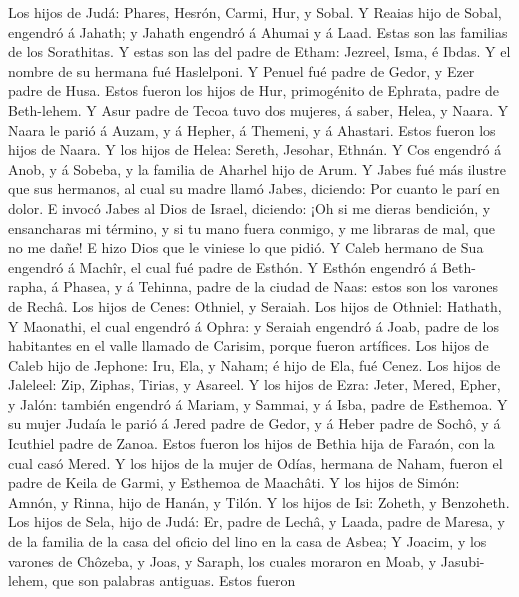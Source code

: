  Los hijos de Judá: Phares, Hesrón, Carmi, Hur, y Sobal.
 Y Reaias hijo de Sobal, engendró á Jahath; y Jahath
engendró á Ahumai y á Laad. Estas son las familias de los Sorathitas.
 Y estas son las del padre de Etham: Jezreel, Isma, é Ibdas.
Y el nombre de su hermana fué Haslelponi.  Y Penuel fué
padre de Gedor, y Ezer padre de Husa. Estos fueron los hijos de Hur,
primogénito de Ephrata, padre de Beth-lehem.  Y Asur padre
de Tecoa tuvo dos mujeres, á saber, Helea, y Naara.  Y Naara
le parió á Auzam, y á Hepher, á Themeni, y á Ahastari. Estos fueron los
hijos de Naara.  Y los hijos de Helea: Sereth, Jesohar,
Ethnán.  Y Cos engendró á Anob, y á Sobeba, y la familia de
Aharhel hijo de Arum.  Y Jabes fué más ilustre que sus
hermanos, al cual su madre llamó Jabes, diciendo: Por cuanto le parí en
dolor.  E invocó Jabes al Dios de Israel, diciendo: ¡Oh si
me dieras bendición, y ensancharas mi término, y si tu mano fuera
conmigo, y me libraras de mal, que no me dañe! E hizo Dios que le
viniese lo que pidió.  Y Caleb hermano de Sua engendró á
Machîr, el cual fué padre de Esthón.  Y Esthón engendró á
Beth-rapha, á Phasea, y á Tehinna, padre de la ciudad de Naas: estos son
los varones de Rechâ.  Los hijos de Cenes: Othniel, y
Seraiah. Los hijos de Othniel: Hathath,  Y Maonathi, el
cual engendró á Ophra: y Seraiah engendró á Joab, padre de los
habitantes en el valle llamado de Carisim, porque fueron artífices.
 Los hijos de Caleb hijo de Jephone: Iru, Ela, y Naham; é
hijo de Ela, fué Cenez.  Los hijos de Jaleleel: Zip,
Ziphas, Tirias, y Asareel.  Y los hijos de Ezra: Jeter,
Mered, Epher, y Jalón: también engendró á Mariam, y Sammai, y á Isba,
padre de Esthemoa.  Y su mujer Judaía le parió á Jered
padre de Gedor, y á Heber padre de Sochô, y á Icuthiel padre de Zanoa.
Estos fueron los hijos de Bethia hija de Faraón, con la cual casó Mered.
 Y los hijos de la mujer de Odías, hermana de Naham, fueron
el padre de Keila de Garmi, y Esthemoa de Maachâti.  Y los
hijos de Simón: Amnón, y Rinna, hijo de Hanán, y Tilón. Y los hijos de
Isi: Zoheth, y Benzoheth.  Los hijos de Sela, hijo de Judá:
Er, padre de Lechâ, y Laada, padre de Maresa, y de la familia de la casa
del oficio del lino en la casa de Asbea;  Y Joacim, y los
varones de Chôzeba, y Joas, y Saraph, los cuales moraron en Moab, y
Jasubi-lehem, que son palabras antiguas.  Estos fueron
